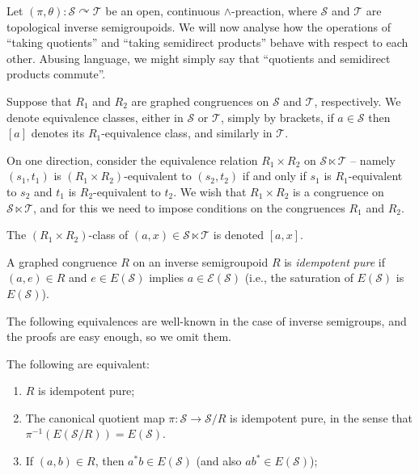 Let $(\pi,\theta)\colon\mathcal{S}\curvearrowright\mathcal{T}$ be an open, continuous $\land$-preaction, where $\mathcal{S}$ and $\mathcal{T}$ are topological inverse semigroupoids. We will now analyse how the operations of ``taking quotients'' and ``taking semidirect products'' behave with respect to each other. Abusing language, we might simply say that ``quotients and semidirect products commute''.

Suppose that $R_1$ and $R_2$ are graphed congruences on $\mathcal{S}$ and $\mathcal{T}$, respectively. We denote equivalence classes, either in $\mathcal{S}$ or $\mathcal{T}$, simply by brackets, if $a\in\mathcal{S}$ then $[a]$ denotes its $R_1$-equivalence class, and similarly in $\mathcal{T}$.

On one direction, consider the equivalence relation $R_1\times R_2$ on $\mathcal{S}\ltimes\mathcal{T}$ -- namely $(s_1,t_1)$ is $(R_1\times R_2)$-equivalent to $(s_2,t_2)$ if and only if $s_1$ is $R_1$-equivalent to $s_2$ and $t_1$ is $R_2$-equivalent to $t_2$. We wish that $R_1\times R_2$ is a congruence on $\mathcal{S}\ltimes\mathcal{T}$, and for this we need to impose conditions on the congruences $R_1$ and $R_2$.

The $(R_1\times R_2)$-class of $(a,x)\in\mathcal{S}\ltimes\mathcal{T}$ is denoted $[a,x]$.

\begin{definition}
    A graphed congruence $R$ on an inverse semigroupoid $R$ is \emph{idempotent pure} if $(a,e)\in R$ and $e\in E(\mathcal{S})$ implies $a\in\mathcal{E(\mathcal{S})}$ (i.e., the saturation of $E(\mathcal{S})$ is $E(\mathcal{S})$).
\end{definition}

The following equivalences are well-known in the case of inverse semigroups, and the proofs are easy enough, so we omit them.

\begin{proposition}\label{prop:equivalencesidempotentpure}
The following are equivalent:
\begin{enumerate}[label=(\roman*)]
    \item\label{prop:equivalencesidempotentpure1} $R$ is idempotent pure;
    \item\label{prop:equivalencesidempotentpure2} The canonical quotient map $\pi\colon\mathcal{S}\to\mathcal{S}/R$ is idempotent pure, in the sense that $\pi^{-1}(E(\mathcal{S}/R))=E(\mathcal{S})$.
    \item\label{prop:equivalencesidempotentpure3} If $(a,b)\in R$, then $a^*b\in E(\mathcal{S})$ (and also $ab^*\in E(\mathcal{S})$);
\end{enumerate}
\end{proposition}

